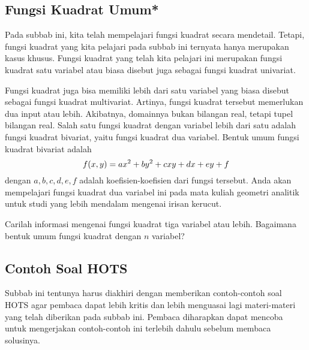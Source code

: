 \subsection{Fungsi Kuadrat Umum*}
	
	Pada subbab ini, kita telah mempelajari fungsi kuadrat secara mendetail. Tetapi, fungsi kuadrat yang kita pelajari pada subbab ini ternyata hanya merupakan kasus khusus. Fungsi kuadrat yang telah kita pelajari ini merupakan fungsi kuadrat satu variabel atau biasa disebut juga sebagai fungsi kuadrat univariat.
	
	\par Fungsi kuadrat juga bisa memiliki lebih dari satu variabel yang biasa disebut sebagai fungsi kuadrat multivariat. Artinya, fungsi kuadrat tersebut memerlukan dua input atau lebih. Akibatnya, domainnya bukan bilangan real, tetapi tupel bilangan real. Salah satu fungsi kuadrat dengan variabel lebih dari satu adalah fungsi kuadrat bivariat, yaitu fungsi kuadrat dua variabel. Bentuk umum fungsi kuadrat bivariat adalah
	\begin{equation} \label{eq:230}
		\mathop{}\!{f}{\left({x, y}\right)} = ax^{2} + by^{2} + cxy + dx + ey + f
	\end{equation}
	dengan $ a, b, c, d, e, f $ adalah koefisien-koefisien dari fungsi tersebut. Anda akan mempelajari fungsi kuadrat dua variabel ini pada mata kuliah geometri analitik untuk studi yang lebih mendalam mengenai irisan kerucut.
	
	\begin{explbox}
		Carilah informasi mengenai fungsi kuadrat tiga variabel atau lebih. Bagaimana bentuk umum fungsi kuadrat dengan $ n $ variabel?
	\end{explbox}

\subsection{Contoh Soal HOTS}
	
	Subbab ini tentunya harus diakhiri dengan memberikan contoh-contoh soal HOTS agar pembaca dapat lebih kritis dan lebih menguasai lagi materi-materi yang telah diberikan pada subbab ini. Pembaca diharapkan dapat mencoba untuk mengerjakan contoh-contoh ini terlebih dahulu sebelum membaca solusinya.
	
